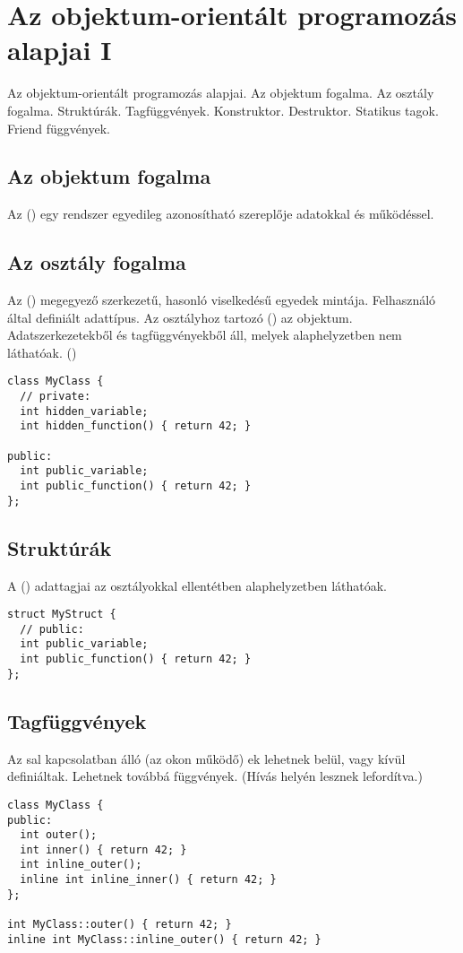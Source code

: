 \documentclass[../../main.tex]{subfiles}
\begin{document}
\section{Az objektum-orientált programozás alapjai I}

\begin{fulltheorem}
  Az objektum-orientált programozás alapjai. Az objektum fogalma. Az osztály
  fogalma. Struktúrák. Tagfüggvények. Konstruktor. Destruktor. Statikus tagok.
  Friend függvények.
\end{fulltheorem}

\subsection{Az objektum fogalma}

Az  () egy rendszer egyedileg azonosítható szereplője
adatokkal és működéssel.

\subsection{Az osztály fogalma}

Az  () megegyező szerkezetű, hasonló viselkedésű
egyedek mintája. Felhasználó által definiált adattípus. Az osztályhoz tartozó
 () az objektum. Adatszerkezetekből és
tagfüggvényekből áll, melyek alaphelyzetben nem láthatóak. ()

\begin{verbatim}
class MyClass {
  // private:
  int hidden_variable;
  int hidden_function() { return 42; }

public:
  int public_variable;
  int public_function() { return 42; }
};
\end{verbatim}

\subsection{Struktúrák}

A  () adattagjai az osztályokkal ellentétben
alaphelyzetben láthatóak.

\begin{verbatim}
struct MyStruct {
  // public:
  int public_variable;
  int public_function() { return 42; }
};
\end{verbatim}

\subsection{Tagfüggvények}
Az sal kapcsolatban álló (az okon működő)
ek lehetnek belül, vagy kívül definiáltak. Lehetnek továbbá
 függvények. (Hívás helyén lesznek lefordítva.)
\begin{verbatim}
class MyClass {
public:
  int outer();
  int inner() { return 42; }
  int inline_outer();
  inline int inline_inner() { return 42; }
};

int MyClass::outer() { return 42; }
inline int MyClass::inline_outer() { return 42; }
\end{verbatim}
\end{document}
